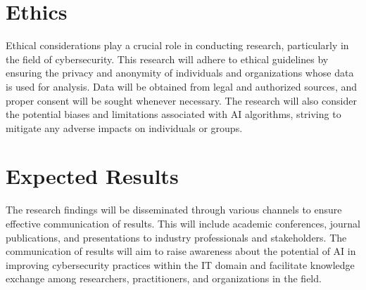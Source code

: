 \documentclass[a4paper,man,12pt]{article}
\begin{document}
\section{Ethics}

  
Ethical considerations play a crucial role in conducting research, particularly in the field of cybersecurity. This research will adhere to ethical guidelines by ensuring the privacy and anonymity of individuals and organizations whose data is used for analysis. Data will be obtained from legal and authorized sources, and proper consent will be sought whenever necessary. The research will also consider the potential biases and limitations associated with AI algorithms, striving to mitigate any adverse impacts on individuals or groups.



\section{Expected Results}

  
  The research findings will be disseminated through various channels to ensure effective communication of results. This will include academic conferences, journal publications, and presentations to industry professionals and stakeholders. The communication of results will aim to raise awareness about the potential of AI in improving cybersecurity practices within the IT domain and facilitate knowledge exchange among researchers, practitioners, and organizations in the field.
\end{document}
